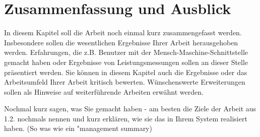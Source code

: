 \label{Zusammenfassung und Ausblick}
\chapter{Zusammenfassung und Ausblick}

In diesem Kapitel soll die Arbeit noch einmal kurz zusammengefasst werden. Insbesondere sollen die wesentlichen Ergebnisse Ihrer Arbeit herausgehoben werden. Erfahrungen, die z.B. Benutzer mit der Mensch-Maschine-Schnittstelle gemacht haben oder Ergebnisse von Leistungsmessungen sollen an dieser Stelle präsentiert werden. Sie können in diesem Kapitel auch die Ergebnisse oder das Arbeitsumfeld Ihrer Arbeit kritisch bewerten. Wünschenswerte Erweiterungen sollen als Hinweise auf weiterführende Arbeiten erwähnt werden.

Nochmal kurz sagen, was Sie gemacht haben - am besten die Ziele der Arbeit aus 1.2. nochmals nennen und kurz erklären, wie sie das in Ihrem System realisiert haben. (So was wie ein "management summary)  

